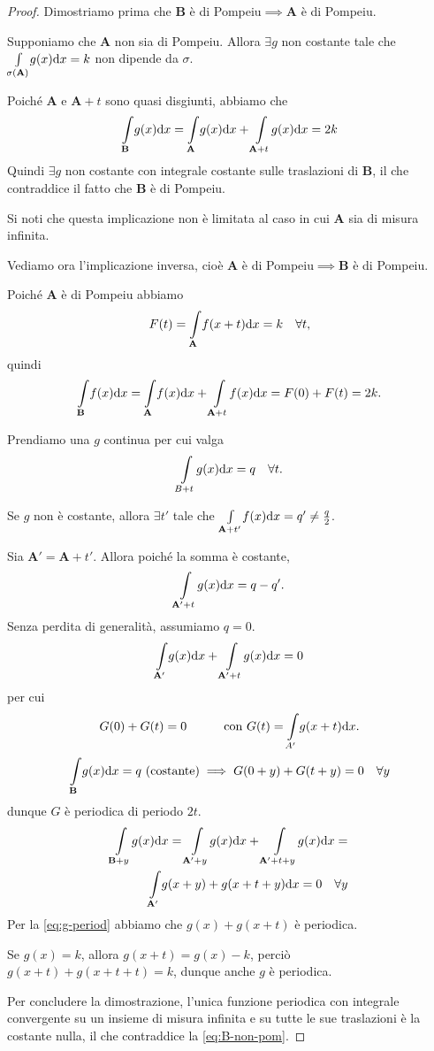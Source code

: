 \documentclass[12pt]{article}
\newcommand\ins[1]{\mathbf #1}
\newcommand\pom{di Pompeiu}
\newcommand\intes[2]{\int\limits_{#1}\!#2\text dx}
\theoremstyle{definition}
\begin{document}
\begin{proof}Dimostriamo prima che $\ins B$ è \pom{}$\implies\ins A$ è \pom{}.

Supponiamo che $\ins A$ non sia \pom{}. Allora $\exists g$ non costante tale che $\intes {\sigma(\ins A)}{g(x)}=k$ non dipende da $\sigma$.

Poiché $\ins A$ e $\ins A+t$ sono quasi disgiunti, abbiamo che
\begin{equation}\label{eq:quasi-disgiunti}
\intes{\ins B}{g(x)}=\intes{\ins A}{g(x)}+\intes{\ins A+t} {g(x)}=2k
\end{equation}
Quindi $\exists g$ non costante con integrale costante sulle traslazioni di $\ins B$, il che contraddice il fatto che $\ins B$ è \pom{}.

Si noti che questa implicazione non è limitata al caso in cui $\ins A$ sia di misura infinita.

Vediamo ora l'implicazione inversa, cioè $\ins A$ è \pom{}$\implies\ins B$ è \pom{}.

Poiché $\ins A$ è \pom{} abbiamo 
\begin{equation}\label{eq:A-pom}
F(t)=\intes{\ins A}{f(x+t)}=k\quad\forall t ,
\end{equation}
quindi \[\intes{\ins B}{f(x)}=\intes{\ins A}{f(x)} + \intes{\ins A+t}{f(x)}=F(0)+F(t)=2k . \]

Prendiamo una $g$ continua per cui valga \begin{equation}\label{eq:B-non-pom}
\intes {B+t}{g(x)}=q\quad\forall t .
\end{equation}

Se $g$ non è costante, allora $\exists t'$ tale che $\intes{\ins A+t'}{f(x)}=q'\not=\frac q2$.%

Sia $\ins{A'}=\ins A+t'$. Allora poiché la somma è costante, \[\intes{\ins{A'}+t}{g(x)}=q-q' . \]
Senza perdita di generalità, assumiamo $q=0$. %
\[\intes{\ins{A'}}{g(x)}+\intes{\ins{A'}+t}{g(x)}=0\] per cui
\[G(0)+G(t)=0\quad\quad\quad\text{con }G(t)=\intes {A'} {g(x+t)} . \]
\[\intes{\ins B}{g(x)}=q\text{ (costante)}\implies G(0+y)+G(t+y)=0\quad\forall y\]
dunque $G$ è periodica di periodo $2t$.
\begin{equation}\label{eq:g-period}
\begin{split}
\intes{\ins B+y}{g(x)}=\intes{\ins{A'}+y}{g(x)}+\intes{\ins{A'}+t+y}{g(x)}=\\
\intes{\ins{A'}}{g(x+y)+g(x+t+y)}=0\quad\forall y
\end{split}\end{equation}
Per la \eqref{eq:g-period} abbiamo che $g(x)+g(x+t)$ è periodica.

Se $g(x)=k$, allora $g(x+t)=g(x)-k$, perciò $g(x+t)+g(x+t+t)=k$, dunque anche $g$ è periodica.

Per concludere la dimostrazione, l'unica funzione periodica con integrale convergente su un insieme di misura infinita e su tutte le sue traslazioni è la costante nulla, il che contraddice la \eqref{eq:B-non-pom}.
\end{proof}
\end{document}
